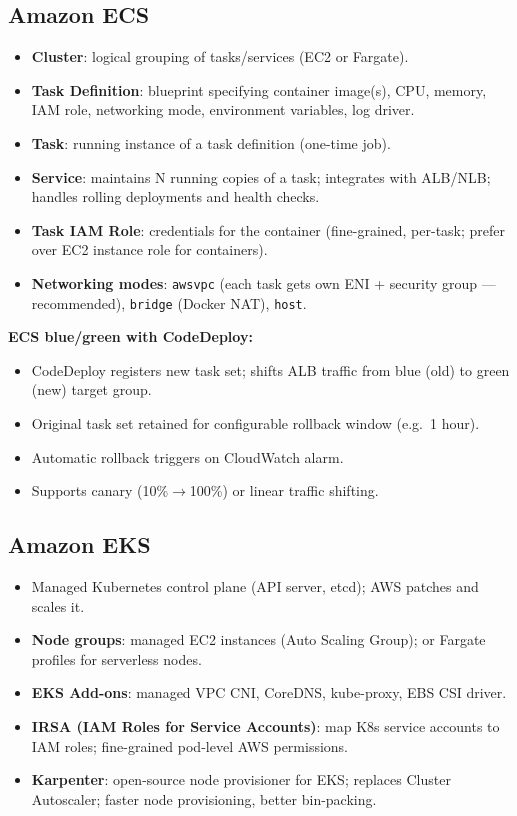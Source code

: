 \subsection{Amazon ECS}

\begin{itemize}
  \item \textbf{Cluster}: logical grouping of tasks/services (EC2 or Fargate).
  \item \textbf{Task Definition}: blueprint specifying container image(s), CPU, memory, IAM role,
        networking mode, environment variables, log driver.
  \item \textbf{Task}: running instance of a task definition (one-time job).
  \item \textbf{Service}: maintains N running copies of a task; integrates with ALB/NLB;
        handles rolling deployments and health checks.
  \item \textbf{Task IAM Role}: credentials for the container (fine-grained, per-task; prefer over
        EC2 instance role for containers).
  \item \textbf{Networking modes}: \texttt{awsvpc} (each task gets own ENI + security group ---
        recommended), \texttt{bridge} (Docker NAT), \texttt{host}.
\end{itemize}

\begin{sapdepth}
\textbf{ECS blue/green with CodeDeploy:}
\begin{itemize}
  \item CodeDeploy registers new task set; shifts ALB traffic from blue (old) to green (new) target group.
  \item Original task set retained for configurable rollback window (e.g.\ 1 hour).
  \item Automatic rollback triggers on CloudWatch alarm.
  \item Supports canary (10\%$\rightarrow$100\%) or linear traffic shifting.
\end{itemize}
\end{sapdepth}

\subsection{Amazon EKS}

\begin{itemize}
  \item Managed Kubernetes control plane (API server, etcd); AWS patches and scales it.
  \item \textbf{Node groups}: managed EC2 instances (Auto Scaling Group); or Fargate profiles
        for serverless nodes.
  \item \textbf{EKS Add-ons}: managed VPC CNI, CoreDNS, kube-proxy, EBS CSI driver.
  \item \textbf{IRSA (IAM Roles for Service Accounts)}: map K8s service accounts to IAM roles;
        fine-grained pod-level AWS permissions.
  \item \textbf{Karpenter}: open-source node provisioner for EKS; replaces Cluster Autoscaler;
        faster node provisioning, better bin-packing.
\end{itemize}

